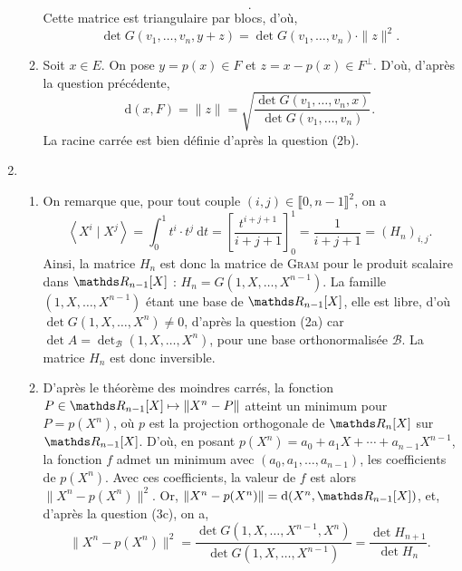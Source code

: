 \documentclass[a4paper]{article}
\begin{document}
\begin{enumerate}
\begin{enumerate}
\[					.\] Cette matrice est triangulaire par blocs, d'où, \[
						\det G(v_1, \ldots, v_n, y + z) = \det G(v_1, \ldots, v_n) \cdot \|z\|^2
					.\]
				\item Soit $x \in E$. On pose $y = p(x) \in F$\/ et $z = x - p(x) \in F^\perp$. D'où, d'après la question précédente, \[
					\mathrm{d}(x,F) = \|z\| = \sqrt{\frac{\det G(v_1, \ldots, v_n, x)}{\det G(v_1,\ldots,v_n)}}
				.\] La racine carrée est bien définie d'après la question (2b).
			\end{enumerate}
		\item
			\begin{enumerate}
				\item On remarque que, pour tout couple $(i,j) \in \llbracket 0,n - 1 \rrbracket^2$, on a \[
						\left<X^i  \mid X^j \right> = \int_{0}^{1} t^{i}\cdot t^{j}~\mathrm{d}t = \left[ \frac{t^{i+j+1}}{i+j+1} \right]_0^1 = \frac{1}{i + j + 1} = (H_n)_{i,j}
					.\]Ainsi, la matrice $H_n$\/ est donc la matrice de \textsc{Gram} pour le produit scalaire dans $\R_{n-1}[X]$\/ : $H_n = G(1, X, \ldots, X^{n-1})$.
					La famille $(1, X, \ldots, X^{n-1})$\/ étant une base de $\R_{n-1}[X]$, elle est libre, d'où $\det G(1, X, \ldots, X^n) \neq 0$, d'après la question (2a) car $\det A = \det_\mathcal{B}(1, X, \ldots, X^n)$, pour une base orthonormalisée $\mathcal{B}$. La matrice $H_n$\/ est donc inversible.
				\item D'après le théorème des moindres carrés, la fonction $P \in \R_{n-1}[X] \mapsto \|X^n-P\|$\/ atteint un minimum pour $P = p(X^n)$, où $p$\/ est la projection orthogonale de $\R_n[X]$\/ sur $\R_{n-1}[X]$.
					D'où, en posant $p(X^n) = a_0 + a_1 X + \cdots + a_{n-1}X^{n-1}$, la fonction $f$\/ admet un minimum avec $(a_0, a_1, \ldots, a_{n-1})$, les coefficients de $p(X^n)$. Avec ces coefficients, la valeur de $f$\/ est alors $\|X^n - p(X^n)\|^2$.
					Or, $\|X^n - p(X^n)\| = \mathrm{d}(X^n, \R_{n-1}[X])$, et, d'après la question (3c), on a, \[
						\|X^n - p(X^n)\|^2 = \frac{\det G(1, X, \ldots, X^{n-1}, X^n)}{\det G(1, X, \ldots, X^{n-1})} = \frac{\det H_{n+1}}{\det H_n}
					.\]
			\end{enumerate}
	\end{enumerate}
\end{document}
